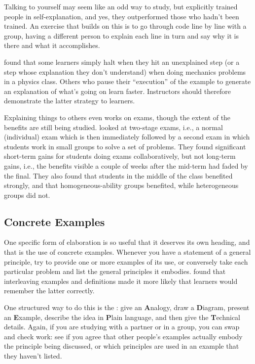 Talking to yourself may seem like an odd way to study, but
\cite{Biel1995} explicitly trained people in self-explanation, and
yes, they outperformed those who hadn't been trained. An exercise that
builds on this is to go through code line by line with a group, having a
different person to explain each line in turn and say why it is there
and what it accomplishes.

\cite{Chi1989} found that some learners simply halt when they hit an
unexplained step (or a step whose explanation they don't understand)
when doing mechanics problems in a physics class. Others who pause their
``execution'' of the example to generate an explanation of what's going on
learn faster. Instructors should therefore demonstrate the latter
strategy to learners.

Explaining things to others even works on exams, though the extent of
the benefits are still being
studied. \cite{Cao2017a,Cao2017b} looked at two-stage
exams, i.e., a normal (individual) exam which is then immediately
followed by a second exam in which students work in small groups to
solve a set of problems. They found significant short-term gains for
students doing exams collaboratively, but not long-term gains, i.e.,
the benefits visible a couple of weeks after the mid-term had faded by
the final. They also found that students in the middle of the class
benefited strongly, and that homogeneous-ability groups benefited,
while heterogeneous groups did not.

\subsection*{Concrete Examples}

One specific form of elaboration is so useful that it deserves its own
heading, and that is the use of concrete examples. Whenever you have a
statement of a general principle, try to provide one or more examples of
its use, or conversely take each particular problem and list the general
principles it embodies. \cite{Raws2014} found that interleaving
examples and definitions made it more likely that learners would
remember the latter correctly.

One structured way to do this is the : give an
\textbf{A}nalogy, draw a \textbf{D}iagram, present an \textbf{E}xample, describe the
idea in \textbf{P}lain language, and then give the \textbf{T}echnical details.
Again, if you are studying with a partner or in a group, you can swap
and check work: see if you agree that other people's examples actually
embody the principle being discussed, or which principles are used in
an example that they haven't listed.


